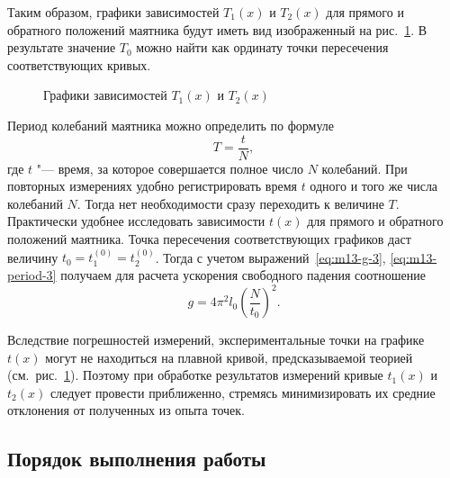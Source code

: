 \documentclass[a4paper, 12pt]{extarticle}
\begin{document}
Таким образом, графики зависимостей $T_1(x)$ и $T_2(x)$ для прямого и обратного положений маятника будут иметь вид изображенный на рис.~\ref{fig:m13-plot-2}. В результате значение $T_0$ можно найти как ординату точки пересечения соответствующих кривых.

\begin{figure}[h]
\begin{center}
\end{center}
\caption{Графики зависимостей $T_1(x)$ и $T_2(x)$ \label{fig:m13-plot-2}}
\end{figure}

Период колебаний маятника можно определить по формуле
\begin{equation}
\label{eq:m13-period-3}
T = \frac{t}{N},
\end{equation}
где $t$ "--- время, за которое совершается полное число $N$ колебаний. 
При повторных измерениях удобно регистрировать время $t$ одного и того же числа колебаний $N$. Тогда нет необходимости сразу переходить к величине $T$.  Практически удобнее исследовать зависимости $t(x)$ для прямого и обратного положений маятника. Точка пересечения соответствующих графиков даст величину $ t_0 = t_1^{(0)} = t_2^{(0)}$. Тогда с учетом выражений~\eqref{eq:m13-g-3}, \eqref{eq:m13-period-3} получаем для расчета ускорения свободного падения соотношение
\begin{equation}
\label{eq:m13-g-4}
g = 4 \pi^2 l_0 \left( \frac{N}{t_0}\right) ^2.
\end{equation}

Вследствие погрешностей измерений, экспериментальные точки на графике $t(x)$ могут не находиться на плавной кривой, предсказываемой теорией (см.~рис.~\ref{fig:m13-plot-2}). Поэтому при обработке результатов измерений кривые $t_1(x)$ и $t_2(x)$ следует провести приближенно, стремясь минимизировать их средние отклонения от полученных из опыта точек.

\subsection{Порядок выполнения работы}
\end{document}
